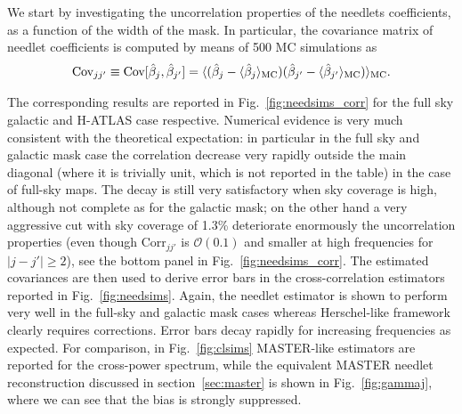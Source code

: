 \documentclass[a4paper,11pt]{article}
\begin{document}
We start by investigating the uncorrelation properties of the needlets coefficients, as a function of the width of the mask. In particular, the covariance matrix of needlet coefficients is computed by means of 500 MC simulations as 
%
\begin{equation}
\label{eq:fullcov}
\text{Cov}_{jj'} \equiv \text{Cov}[\hat{\beta}_{j},\hat{\beta}_{j'}] = \langle(\hat{\beta}_j-\langle \hat{\beta}_j\rangle_{\rm MC})(\hat{\beta}_{j
'}-\langle\hat{\beta}_{j'}\rangle_{\rm MC}) \rangle_{\rm MC}.
\end{equation}
%

The corresponding results are reported in Fig.~\ref{fig:needsims_corr} for the full sky galactic and H-ATLAS case respective. Numerical evidence is very much consistent with the theoretical expectation: in particular in the full sky and galactic mask case the correlation decrease very rapidly outside the main diagonal (where it is trivially unit, which is not reported in the table) in the case of full-sky maps. The decay is still very satisfactory when sky coverage is high, although not complete as for the galactic mask; on the other hand a very aggressive cut with sky coverage of 1.3\% deteriorate enormously the uncorrelation properties (even though Corr$_{jj'}$ is $\mathcal{O}(0.1)$ and smaller at high frequencies for $|j-j'|\ge2$), see the bottom panel in Fig.~\ref{fig:needsims_corr}. The estimated covariances are then used to derive error bars in the cross-correlation estimators reported in Fig.~\ref{fig:needsims}. Again, the needlet estimator is shown to perform very well in the full-sky and galactic mask cases whereas Herschel-like framework clearly requires corrections. Error bars decay rapidly for increasing frequencies as expected.
For comparison, in Fig.~\ref{fig:clsims} MASTER-like estimators are reported for the cross-power spectrum, while the equivalent MASTER needlet reconstruction discussed in section~\ref{sec:master}  is shown in Fig.~\ref{fig:gammaj}, where we can see that the bias is strongly suppressed. 
\end{document}

